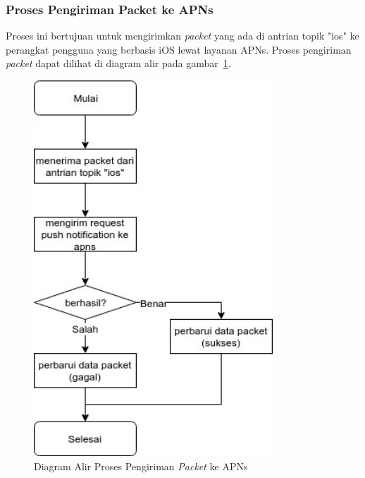 \subsubsection{Proses Pengiriman Packet ke APNs}
\par Proses ini bertujuan untuk mengirimkan \textit{packet} yang ada di antrian topik "ios" ke perangkat pengguna yang berbasis iOS lewat layanan APNs. Proses pengiriman \textit{packet} dapat dilihat di diagram alir pada
gambar~\ref{flowchart_pengiriman_packet_ke_apns}.
\begin{figure}[H]
    \centering\includegraphics[width=0.8\textwidth]{bab3/figures/flowchart_pengiriman_packet_ke_apns.jpg}
    \caption{Diagram Alir Proses Pengiriman \textit{Packet} ke APNs}
    \label{flowchart_pengiriman_packet_ke_apns}
\end{figure}

